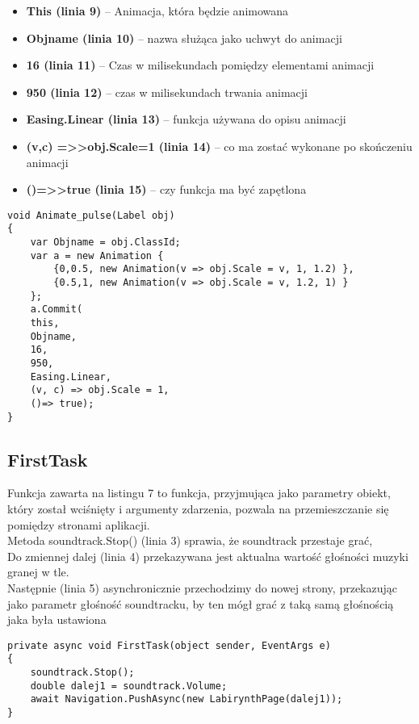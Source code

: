 \begin{itemize}
	\item \textbf{  This (linia 9) } – Animacja, która będzie animowana   
	\item \textbf{  Objname (linia 10) } – nazwa służąca jako uchwyt do animacji  
	\item \textbf{  16 (linia 11) } – Czas w milisekundach pomiędzy elementami animacji  
	\item \textbf{  950 (linia 12) } – czas w milisekundach trwania animacji   
	\item \textbf{  Easing.Linear (linia 13) } – funkcja używana do opisu animacji 
	\item \textbf{  (v,c) =>>obj.Scale=1 (linia 14) } – co ma zostać wykonane po skończeniu animacji   
	\item \textbf{  ()=>>true (linia 15) } – czy funkcja ma być zapętlona   
\end{itemize}

\begin{lstlisting}[caption=Animate\_pulse]
void Animate_pulse(Label obj)
{
	var Objname = obj.ClassId;
	var a = new Animation {
		{0,0.5, new Animation(v => obj.Scale = v, 1, 1.2) },
		{0.5,1, new Animation(v => obj.Scale = v, 1.2, 1) }
	};
	a.Commit(
	this,
	Objname,
	16,
	950,
	Easing.Linear, 
	(v, c) => obj.Scale = 1,
	()=> true);
}
\end{lstlisting}

\subsection{FirstTask}
\hspace{0.60cm}Funkcja zawarta na listingu 7 to funkcja, przyjmująca jako parametry obiekt, który został wciśnięty i argumenty zdarzenia, pozwala na przemieszczanie się pomiędzy stronami aplikacji.
\\
Metoda soundtrack.Stop() (linia 3) sprawia, że soundtrack przestaje grać,
\\
Do zmiennej dalej (linia 4) przekazywana jest aktualna wartość głośności muzyki granej w tle.
\\
Następnie (linia 5) asynchronicznie przechodzimy do nowej strony, przekazując jako parametr głośność soundtracku, by ten mógł grać z taką samą głośnością jaka była ustawiona

\begin{lstlisting}[caption=FirstTask]
private async void FirstTask(object sender, EventArgs e)
{
	soundtrack.Stop();
	double dalej1 = soundtrack.Volume;
	await Navigation.PushAsync(new LabirynthPage(dalej1));
}
\end{lstlisting}


